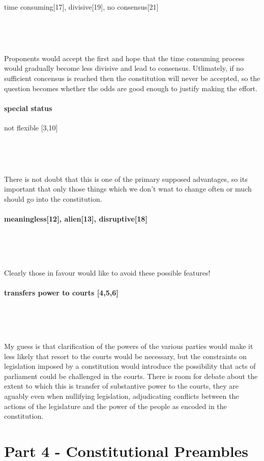 \documentclass[14pt,titlepage]{extarticle}
\begin{document}
time consuming[17], divisive[19], no consensus[21]

\

\

Proponents would accept the first and hope that the time consuming process would gradually become less divisive and lead to consensus.
Utlimately, if no sufficient concensus is reached then the constitution will never be accepted, so the question becomes whether the odds are good enough to justify making the effort.

\paragraph{special status}

not flexible [3,10]

\ 

\

There is not doubt that this is one of the primary supposed advantages, so its important that only those things which we don't wnat to change often or much should go into the constitution.

\paragraph{meaningless[12], alien[13], disruptive[18]}

\

\

Clearly those in favour would like to avoid these possible features!

\paragraph{transfers power to courts [4,5,6]}

\

\ 

My guess is that clarification of the powers of the various parties would make it less likely that resort to the courts would be necessary, but the constraints on legislation imposed by a constitution would introduce the possibility that acts of parliament could be challenged in the courts.
There is room for debate about the extent to which this is transfer of substantive power to the courts, they are aguably even when nullifying legislation, adjudicating conflicts between the actions of the legislature and the power of the people as encoded in the constitution.


\section{Part 4 - Constitutional Preambles}\label{part4}
\end{document}
